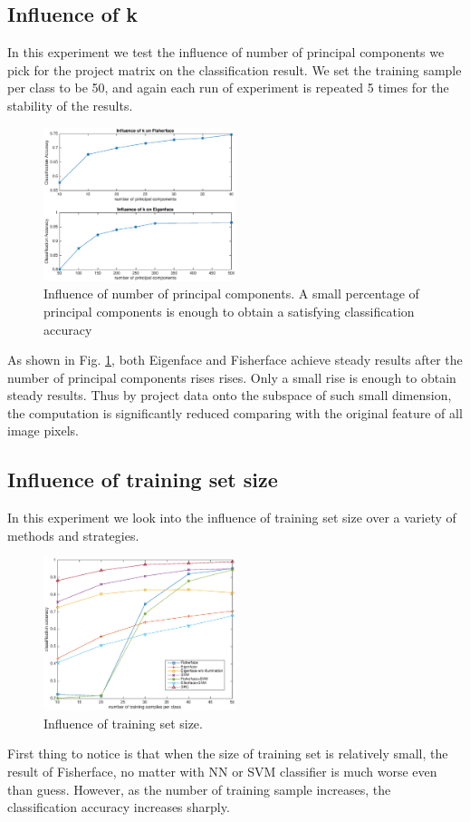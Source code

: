 \documentclass[conference]{IEEEtran}
\begin{document}
\subsection{Influence of k}
In this experiment we test the influence of number of principal components we pick for the project matrix on the classification result. We set the training sample per class to be 50, and again each run of experiment is repeated 5 times for the stability of the results.
\begin{figure}[htbp]
	\includegraphics[width=0.5\textwidth]{infk}
	\caption{Influence of number of principal components. A small percentage of principal components is enough to obtain a satisfying classification accuracy}
	\label{infk}
\end{figure}
As shown in Fig. \ref{infk}, both Eigenface and Fisherface achieve steady results after the number of principal components rises rises. Only a small rise is enough to obtain steady results. Thus by project data onto the subspace of such small dimension, the computation is significantly reduced comparing with the original feature of all image pixels.
\subsection{Influence of training set size}
In this experiment we look into the influence of training set size over a variety of methods and strategies. 
\begin{figure}[htbp]
	\includegraphics[width=0.5\textwidth]{inftr}
	\caption{Influence of training set size.}
	\label{inftr}
\end{figure}
First thing to notice is that when the size of training set is relatively small, the result of Fisherface, no matter with NN or SVM classifier is much worse even than guess. However, as the number of training sample increases, the classification accuracy increases sharply.
\end{document}

